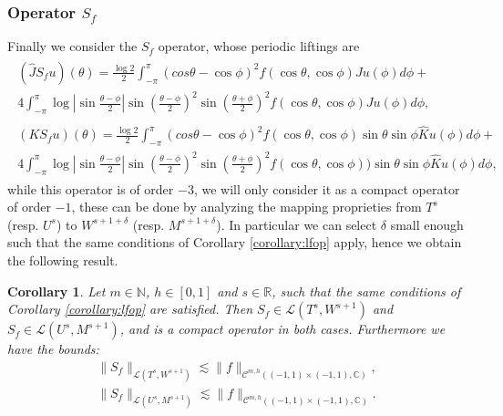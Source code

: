 \documentclass{article}
\newtheorem{corollary}[theorem]{Corollary}
\newcommand{\IC}{{\mathbb C}}
\newcommand{\IN}{{\mathbb N}}
\newcommand{\IR}{{\mathbb R}}
\newcommand{\cmspaceh}[4]{\mathcal{C}^{#1,#2} \left( #3, #4 \right)}
\newcommand{\iinterv}{(-1,1)\times(-1,1)}
\begin{document}
\subsubsection{Operator $S_f$}

Finally we consider the $S_f$ operator, whose periodic liftings are 
\begin{align*}
\begin{split}
(\widehat{J}S_fu)(\theta) = \frac{\log 2}{2}\int_{-\pi}^\pi
(cos \theta - \cos \phi)^2 f(\cos \theta, \cos \phi)Ju(\phi) d\phi +\\
4 \int_{-\pi}^\pi \log \left\vert \sin \frac{\theta-\phi}{2} \right\vert \sin\left( \frac{\theta-\phi}{2} \right)^2
\sin\left( \frac{\theta+\phi}{2} \right)^2 f(\cos \theta, \cos \phi) Ju (\phi) d \phi, 
\end{split} \\
\begin{split}
(K S_fu)(\theta) = \frac{\log 2}{2}\int_{-\pi}^\pi
(cos \theta - \cos \phi)^2 f(\cos \theta, \cos \phi)\sin \theta \sin \phi \widehat{K}u(\phi) d\phi +\\
4 \int_{-\pi}^\pi \log \left\vert \sin \frac{\theta-\phi}{2} \right\vert \sin\left( \frac{\theta-\phi}{2} \right)^2
\sin\left( \frac{\theta+\phi}{2} \right)^2 f(\cos \theta, \cos \phi) )\sin \theta \sin \phi \widehat{K}u (\phi) d \phi, 
\end{split} 
\end{align*}
while this operator is of order $-3$, we will only consider it as a compact operator of order $-1$, these can be done by analyzing the mapping proprieties from $T^s$ (resp. $U^s$) to $W^{s+1+\delta}$ (resp. $M^{s+1+\delta}$). In particular we can select $\delta$ small enough such that the same conditions of Corollary \ref{corollary:lfop} apply, hence we obtain the following result. 

\begin{corollary}
\label{corollary:sfop}
Let $m \in \IN$, $h \in [0,1]$ and $s \in \IR$, such that the same conditions of Corollary \ref{corollary:lfop} are satisfied. Then
 $ S_f  \in \mathcal{L}(T^{s},W^{s+1})$ and  $S_f  \in \mathcal{L}(U^{s},M^{s+1})$, and is a compact operator in both cases. Furthermore we have the bounds: 
\begin{align*}
\| S_f\|_{ \mathcal{L}(T^{s},W^{s+1})} \lesssim \|f\|_{\cmspaceh{m}{h}{\iinterv}{\IC}},\\
\| S_f\|_{ \mathcal{L}(U^{s},M^{s+1})} \lesssim \|f\|_{\cmspaceh{m}{h}{\iinterv}{\IC}}.
\end{align*}
\end{corollary}
\end{document}
